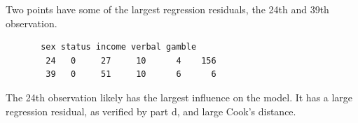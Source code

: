 \documentclass[12pt,letterpaper]{article}
\begin{document}
\begin{enumerate}[(a)]
	Two points have some of the largest regression residuals, the 24th and 39th observation.

		\begin{verbatim}
	   sex status income verbal gamble
		24   0     27     10      4    156
		39   0     51     10      6      6
		\end{verbatim} 
	
	The 24th observation likely has the largest influence on the model. It has a large regression residual, as verified by part d, and large Cook's distance.
	
\end{enumerate}
\end{document}
